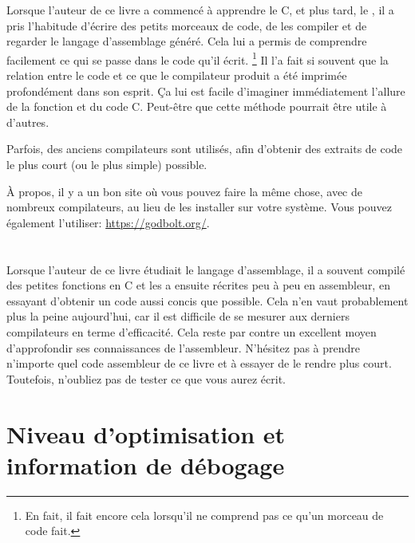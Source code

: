 ﻿

Lorsque l'auteur de ce livre a commencé à apprendre le C, et plus tard, le \Cpp, il a pris l'habitude d'écrire des petits morceaux de
code, de les compiler et de regarder le langage d'assemblage généré.
Cela lui a permis de comprendre facilement ce qui se passe dans le code qu'il écrit.
\footnote{En fait, il fait encore cela lorsqu'il ne comprend pas ce qu'un morceau de code fait.}
Il l'a fait si souvent que la relation entre le code \Cpp et ce que le compilateur produit a été imprimée profondément dans son
 esprit.
Ça lui est facile d'imaginer immédiatement l'allure de la fonction et du code C.
Peut-être que cette méthode pourrait être utile à d'autres.


Parfois, des anciens compilateurs sont utilisés, afin d'obtenir des extraits de code le plus court (ou le plus simple) possible.

À propos, il y a un bon site où vous pouvez faire la même chose, avec de nombreux
compilateurs, au lieu de les installer sur votre système.
Vous pouvez également l'utiliser: \url{https://godbolt.org/}.

\section*{\Exercises}

Lorsque l'auteur de ce livre étudiait le langage d'assemblage, il a souvent compilé des petites fonctions en C et les a ensuite
récrites peu à peu en assembleur, en essayant d'obtenir un code aussi concis que possible.
Cela n'en vaut probablement plus la peine aujourd'hui, car il est difficile
de se mesurer aux derniers compilateurs en terme d'efficacité. Cela reste par contre un excellent moyen d'approfondir ses connaissances
de l'assembleur.
N'hésitez pas à prendre n'importe quel code assembleur de ce livre et à essayer de le rendre plus court.
Toutefois, n'oubliez pas de tester ce que vous aurez écrit.

\section*{Niveau d'optimisation et information de débogage}

